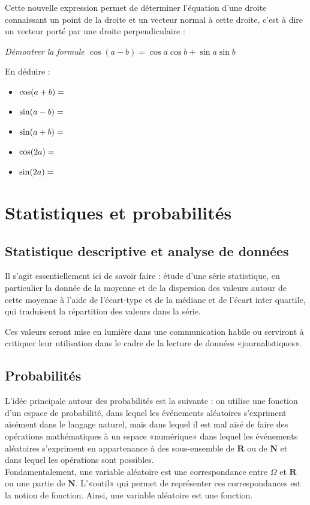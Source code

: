 \documentclass[a4paper,12pt,french]{article}
\newcommand{\N}{\mathbf{N}}
\newcommand{\R}{\mathbf{R}}
\begin{document}
Cette nouvelle expression permet de déterminer l'équation d'une droite
connaissant un point de la droite et un vecteur normal à cette droite,
c'est à dire un vecteur porté par une droite perpendiculaire :
\begin{center}
\end{center}

\emph{Démontrer la formule $\cos(a-b) = \cos a\cos b + \sin a\sin b$}

En déduire :
\begin{itemize}
  \item $\cos(a+b) = \dotfill$
  \item $\sin(a-b) = \dotfill$
  \item $\sin(a+b) = \dotfill$
  \item $\cos(2a) = \dotfill$
  \item $\sin(2a) = \dotfill$
\end{itemize}

\section{Statistiques et probabilités}

\subsection{Statistique descriptive et analyse de données}

Il s'agit essentiellement ici de savoir faire : étude d'une série
statistique, en particulier la donnée de la moyenne et de la dispersion
des valeurs autour de cette moyenne à l'aide de l'écart-type et de la
médiane et de l'écart inter quartile, qui traduisent la répartition des
valeurs dans la série.

Ces valeurs seront mise en lumière dans une communication habile ou
serviront à critiquer leur utilisation dans le cadre de la lecture de
données «journalistiques».

\subsection{Probabilités}

L'idée principale autour des probabilités est la suivante : on utilise
une fonction d'un espace de probabilité, dans lequel les événements
aléatoires s'expriment aisément dans le langage naturel, mais dans
lequel il est mal aisé de faire des opérations mathématiques à un espace
«numérique» dans lequel les événements aléatoires s'expriment en
appartenance à des sous-ensemble de $\R$ ou de $\N$ et dans lequel les
opérations sont possibles.\\
Fondamentalement, une variable aléatoire est une correspondance entre
$\Omega$ et $\R$ ou une partie de $\N$. L'«outil» qui permet de
représenter ces correspondances est la notion de fonction. Ainsi, une
variable aléatoire est une fonction.
\end{document}
